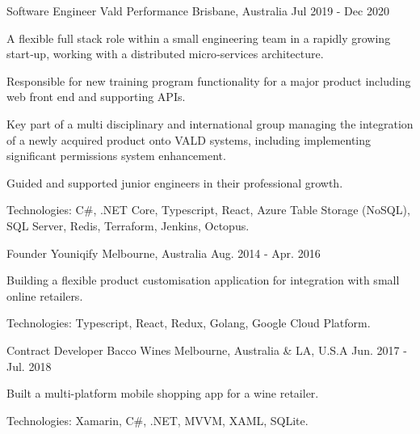 \begin{cventries}
\cventry
{Software Engineer} %
{Vald Performance} %
{Brisbane, Australia} %
{Jul 2019 - Dec 2020} %
{
  \begin{cvitems} %
    \item {A flexible full stack role within a small engineering team in a rapidly growing start‑up, working with a distributed micro‑services architecture.}
    \item {Responsible for new training program functionality for a major product including web front end and supporting APIs.}
    \item {Key part of a multi disciplinary and international group managing the integration of a newly acquired product onto VALD systems, including implementing significant permissions system enhancement.}
    \item {Guided and supported junior engineers in their professional growth.}
    \item {Technologies: C\#, .NET Core, Typescript, React, Azure Table Storage (NoSQL), SQL Server, Redis, Terraform, Jenkins, Octopus.}
  \end{cvitems}
}

\cventry
{Founder} %
{Youniqify} %
{Melbourne, Australia} %
{Aug. 2014 - Apr. 2016} %
{
  \begin{cvitems} %
    \item {Building a flexible product customisation application for integration with small online retailers.}
    \item {Technologies: Typescript, React, Redux, Golang, Google Cloud Platform.} 
  \end{cvitems}
}

\cventry
{Contract Developer} %
{Bacco Wines} %
{Melbourne, Australia \& LA, U.S.A} %
{Jun. 2017 - Jul. 2018} %
{
  \begin{cvitems} %
    \item {Built a multi-platform mobile shopping app for a wine retailer.}
    \item {Technologies: Xamarin, C\#, .NET, MVVM, XAML, SQLite.}
  \end{cvitems}
}


\end{cventries}
